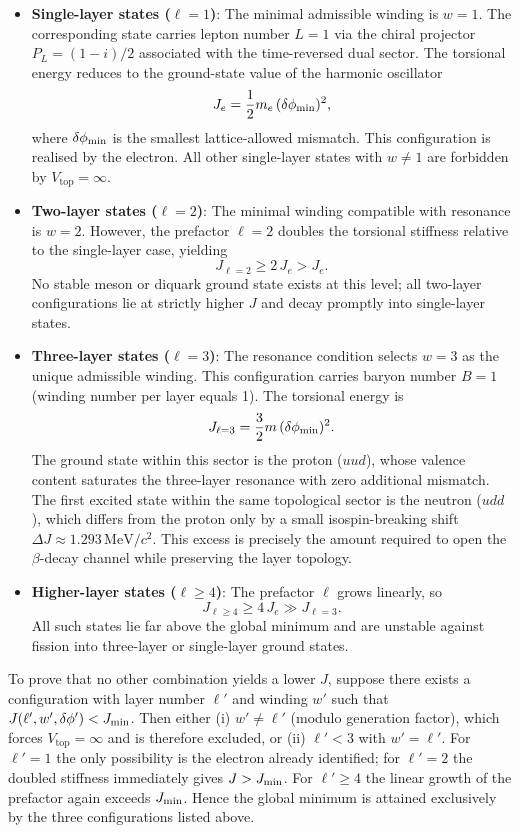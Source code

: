 \documentclass[a4paper]{article}
\begin{document}
\begin{itemize}
\item \textbf{Single-layer states (\(\ell=1\))}: The minimal admissible winding is \(w=1\). The corresponding state carries lepton number \(L=1\) via the chiral projector \(P_L = (1-i)/2\) associated with the time-reversed dual sector. The torsional energy reduces to the ground-state value of the harmonic oscillator
  \[
  J_{e} = \frac12 m_e \,(\delta\phi_{\rm min})^2,
  \]
  where \(\delta\phi_{\rm min}\) is the smallest lattice-allowed mismatch. This configuration is realised by the electron. All other single-layer states with \(w\neq1\) are forbidden by \(V_\text{top}=\infty\).

\item \textbf{Two-layer states (\(\ell=2\))}: The minimal winding compatible with resonance is \(w=2\). However, the prefactor \(\ell=2\) doubles the torsional stiffness relative to the single-layer case, yielding
  \[
  J_{\ell=2} \ge 2\,J_e > J_e.
  \]
  No stable meson or diquark ground state exists at this level; all two-layer configurations lie at strictly higher \(J\) and decay promptly into single-layer states.

\item \textbf{Three-layer states (\(\ell=3\))}: The resonance condition selects \(w=3\) as the unique admissible winding. This configuration carries baryon number \(B=1\) (winding number per layer equals 1). The torsional energy is
  \[
  J_{\ell=3} = \frac32 m \,(\delta\phi_{\rm min})^2.
  \]
  The ground state within this sector is the proton (\(uud\)), whose valence content saturates the three-layer resonance with zero additional mismatch. The first excited state within the same topological sector is the neutron (\(udd\)), which differs from the proton only by a small isospin-breaking shift \(\Delta J \approx 1.293\,\mathrm{MeV}/c^2\). This excess is precisely the amount required to open the \(\beta\)-decay channel while preserving the layer topology.

\item \textbf{Higher-layer states (\(\ell\ge4\))}: The prefactor \(\ell\) grows linearly, so
  \[
  J_{\ell\ge4} \ge 4\,J_e \gg J_{\ell=3}.
  \]
  All such states lie far above the global minimum and are unstable against fission into three-layer or single-layer ground states.
\end{itemize}

To prove that no other combination yields a lower \(J\), suppose there exists a configuration with layer number \(\ell'\) and winding \(w'\) such that \(J(\ell',w',\delta\phi') < J_{\rm min}\). Then either (i) \(w'\neq\ell'\) (modulo generation factor), which forces \(V_\text{top}=\infty\) and is therefore excluded, or (ii) \(\ell' < 3\) with \(w'=\ell'\). For \(\ell'=1\) the only possibility is the electron already identified; for \(\ell'=2\) the doubled stiffness immediately gives \(J> J_{\rm min}\). For \(\ell'\ge4\) the linear growth of the prefactor again exceeds \(J_{\rm min}\). Hence the global minimum is attained exclusively by the three configurations listed above.
\end{document}
